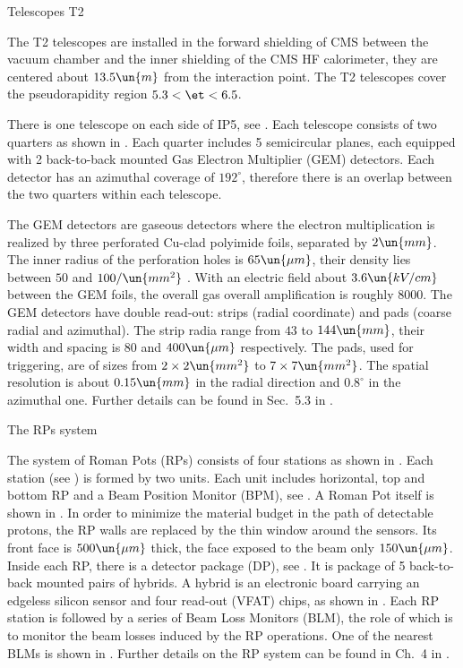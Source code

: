 \caption{Telescopes T2}

The T2 telescopes are installed in the forward shielding of CMS between the vacuum chamber and the inner shielding of the CMS HF calorimeter, they are centered about $13.5\un{m}$ from the interaction point. The T2 telescopes cover the pseudorapidity region $5.3 < \et < 6.5$.

There is one telescope on each side of IP5, see . Each telescope consists of two quarters as shown in . Each quarter includes 5 semicircular planes, each equipped with 2 back-to-back mounted Gas Electron Multiplier (GEM) detectors. Each detector has an azimuthal coverage of $192^\circ$, therefore there is an overlap between the two quarters within each telescope.

The GEM detectors are gaseous detectors where the electron multiplication is realized by three perforated Cu-clad polyimide foils, separated by $2\un{mm}$. The inner radius of the perforation holes is $65\un{\mu m}$, their density lies between $50$ and $100/\un{mm^2}$ . With an electric field about $3.6 \un{kV/cm}$ between the GEM foils, the overall gas overall amplification is roughly $8000$. The GEM detectors have double read-out: strips (radial coordinate) and pads (coarse radial and azimuthal). The strip radia range from $43$ to $144\un{mm}$, their width and spacing is $80$ and $400\un{\mu m}$ respectively. The pads, used for triggering, are of sizes from $2\times 2\un{mm^2}$ to $7\times 7\un{mm^2}$. The spatial resolution is about $0.15\un{mm}$ in the radial direction and $0.8^\circ$ in the azimuthal one. Further details can be found in Sec.~5.3 in .



\bmfig
{}
\emfig


\caption{The RPs system}

The system of Roman Pots (RPs) consists of four stations as shown in . Each station (see ) is formed by two units. Each unit includes horizontal, top and bottom RP and a Beam Position Monitor (BPM), see . A Roman Pot itself is shown in . In order to minimize the material budget in the path of detectable protons, the RP walls are replaced by the thin window around the sensors. Its front face is $500\un{\mu m}$ thick, the face exposed to the beam only $150\un{\mu m}$. Inside each RP, there is a detector package (DP), see . It is package of 5 back-to-back mounted pairs of hybrids. A hybrid is an electronic board carrying an edgeless silicon sensor and four read-out (VFAT) chips, as shown in . Each RP station is followed by a series of Beam Loss Monitors (BLM), the role of which is to monitor the beam losses induced by the RP operations. One of the nearest BLMs is shown in . Further details on the RP system can be found in Ch.~4 in .

